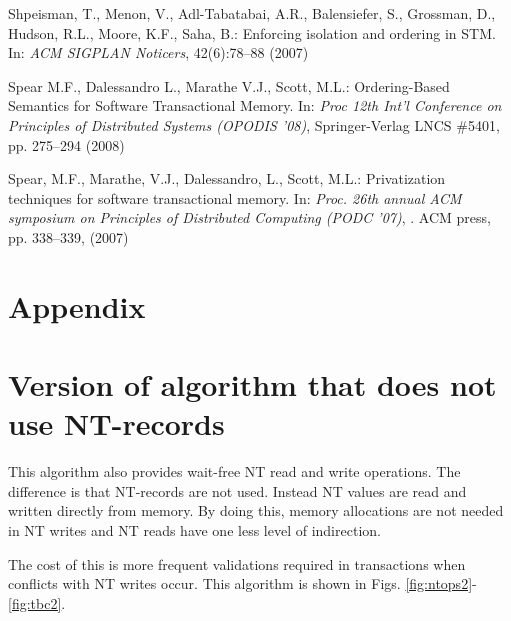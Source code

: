 \documentclass[runningheads,a4paper]{llncs}
\begin{document}
\begin{thebibliography}{4}
 Shpeisman, T.,  Menon, V.,  Adl-Tabatabai, A.R.,  Balensiefer, S.,  Grossman, D.,
 Hudson, R.L., Moore, K.F., Saha, B.:
Enforcing isolation and ordering in STM. 
In: {\it ACM  SIGPLAN Noticers}, 42(6):78--88  (2007)

Spear M.F.,  Dalessandro L.,  Marathe V.J.,  Scott, M.L.:
Ordering-Based Semantics for Software Transactional Memory. 
In: {\it Proc  12th Int'l Conference on Principles of Distributed Systems 
(OPODIS '08)},  Springer-Verlag LNCS \#5401, pp. 275--294 (2008) 

Spear, M.F.,  Marathe, V.J.,  Dalessandro, L.,  Scott, M.L.: 
Privatization techniques for software transactional memory. 
In: {\it Proc. 26th  annual ACM symposium on Principles of Distributed Computing 
(PODC '07)}, . ACM press, pp.  338--339, (2007)

\end{thebibliography}


\section*{Appendix}
\section{Version of algorithm that does not use NT-records}
This algorithm also provides wait-free NT read and write operations.
The difference is that NT-records are not used.
Instead NT values are read and written directly from memory.
By doing this, memory allocations are not needed in NT writes and NT reads have
one less level of indirection.

The cost of this is more frequent validations required in transactions when conflicts with NT writes occur.
This algorithm is shown in Figs. \ref{fig:ntops2}-\ref{fig:tbc2}.
\end{document}
